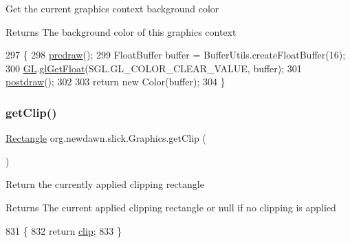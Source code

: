 Get the current graphics context background color

\begin{DoxyReturn}{Returns}
The background color of this graphics context 
\end{DoxyReturn}

\begin{DoxyCode}
297                                  \{
298         \mbox{\hyperlink{classorg_1_1newdawn_1_1slick_1_1_graphics_a7b4c203181e3b6302d51ed9b24596b8d}{predraw}}();
299         FloatBuffer buffer = BufferUtils.createFloatBuffer(16);
300         \mbox{\hyperlink{classorg_1_1newdawn_1_1slick_1_1_graphics_a39ca68db81b225982a4421c4a6835eed}{GL}}.\mbox{\hyperlink{interfaceorg_1_1newdawn_1_1slick_1_1opengl_1_1renderer_1_1_s_g_l_aa9013a2eb8ec3fa76714ed1cfcb6f5bf}{glGetFloat}}(SGL.GL\_COLOR\_CLEAR\_VALUE, buffer);
301         \mbox{\hyperlink{classorg_1_1newdawn_1_1slick_1_1_graphics_abe054371d1486618ff327bbbcf02ff97}{postdraw}}();
302 
303         \textcolor{keywordflow}{return} \textcolor{keyword}{new} Color(buffer);
304     \}
\end{DoxyCode}
\mbox{\label{classorg_1_1newdawn_1_1slick_1_1_graphics_a880590863b93a28508926c4028caec0d}} 
\subsubsection{\texorpdfstring{get\+Clip()}{getClip()}}
{\footnotesize\ttfamily \mbox{\hyperlink{classorg_1_1newdawn_1_1slick_1_1geom_1_1_rectangle}{Rectangle}} org.\+newdawn.\+slick.\+Graphics.\+get\+Clip (\begin{DoxyParamCaption}{ }\end{DoxyParamCaption})\hspace{0.3cm}{\ttfamily [inline]}}

Return the currently applied clipping rectangle

\begin{DoxyReturn}{Returns}
The current applied clipping rectangle or null if no clipping is applied 
\end{DoxyReturn}

\begin{DoxyCode}
831                                \{
832         \textcolor{keywordflow}{return} \mbox{\hyperlink{classorg_1_1newdawn_1_1slick_1_1_graphics_ad6d9618b35d844e23f1a27b45491020a}{clip}};
833     \}
\end{DoxyCode}
\mbox{\label{classorg_1_1newdawn_1_1slick_1_1_graphics_a13cd0f941d19d8b8fced63cc47728e7d}} 
